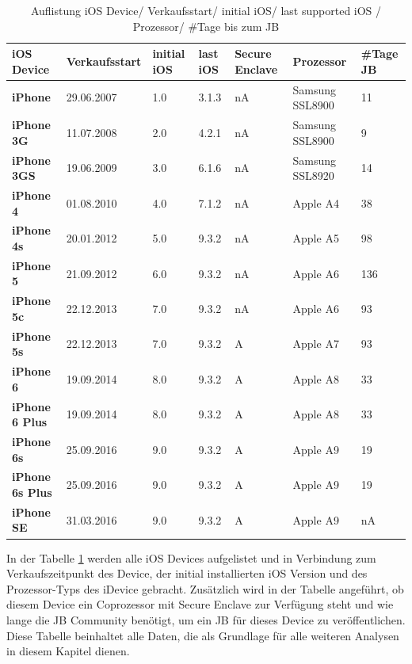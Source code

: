 \begin{table}[htp!]
    \begin{center}
        \begin{tabular}{|p{30mm}|p{27mm}|p{12mm}|p{10mm}|p{18mm}|p{2cm}|p{15mm}|} \hline
            \textbf{iOS Device} & \textbf{Verkaufsstart} & \textbf{initial iOS} & \textbf{last iOS} & \textbf{Secure Enclave} & \textbf{Prozessor}  & \textbf{\#Tage JB} \\ \hline
            \textbf{iPhone} & 29.06.2007  & 1.0 & 3.1.3 & nA & Samsung SSL8900 & 11\\ \hline
            \textbf{iPhone 3G} & 11.07.2008 & 2.0 & 4.2.1 & nA & Samsung SSL8900 & 9\\ \hline
            \textbf{iPhone 3GS} & 19.06.2009 & 3.0 & 6.1.6 & nA & Samsung SSL8920 & 14\\ \hline
            \textbf{iPhone 4} & 01.08.2010 & 4.0 & 7.1.2 & nA & Apple A4 & 38 \\ \hline
            \textbf{iPhone 4s} & 20.01.2012 & 5.0 & 9.3.2 & nA & Apple A5 & 98 \\ \hline 
            \textbf{iPhone 5} & 21.09.2012 & 6.0 &  9.3.2 & nA & Apple A6 & 136 \\ \hline
            \textbf{iPhone 5c} & 22.12.2013 & 7.0 & 9.3.2 & nA & Apple A6 & 93 \\ \hline
            \textbf{iPhone 5s} & 22.12.2013 & 7.0 & 9.3.2 & A & Apple A7 & 93 \\ \hline
            \textbf{iPhone 6} & 19.09.2014 & 8.0 & 9.3.2 & A & Apple A8 & 33\\ \hline
            \textbf{iPhone 6 Plus} & 19.09.2014 & 8.0 & 9.3.2 &  A & Apple A8 & 33\\ \hline
            \textbf{iPhone 6s} & 25.09.2016 & 9.0 &  9.3.2 & A & Apple A9 & 19\\ \hline
            \textbf{iPhone 6s Plus} & 25.09.2016 & 9.0 & 9.3.2 &  A & Apple A9 & 19\\ \hline
            \textbf{iPhone SE} & 31.03.2016 & 9.0 &  9.3.2 & A & Apple A9 & nA\\ \hline  
        \end{tabular} 
        \caption{Auflistung iOS Device/ Verkaufsstart/ initial iOS/ last supported iOS / Prozessor/ \#Tage bis zum JB}
        \label{tab:iOSHW}
    \end{center}
\end{table}

In der Tabelle \ref{tab:iOSHW} werden alle iOS Devices aufgelistet und in Verbindung zum Verkaufszeitpunkt des Device, der initial installierten iOS Version und des Prozessor-Typs des iDevice gebracht. Zusätzlich wird in der Tabelle angeführt, ob diesem Device ein Coprozessor mit Secure Enclave zur Verfügung steht und wie lange die JB Community benötigt, um ein JB für dieses Device zu veröffentlichen. Diese Tabelle beinhaltet alle Daten, die als Grundlage für alle weiteren Analysen in diesem Kapitel dienen.\par


